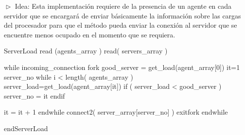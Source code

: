 
$\vartriangleright$ Idea: Esta implementación requiere de la presencia de un agente en cada servidor que se encargará de enviar básicamente
la información sobre las cargas del procesador para que el método pueda enviar la conexión al servidor que se encuentre menos ocupado en el
momento que se requiera.\\

\begin{verbatimtab}[\myTabs]

ServerLoad
	read (agents_array )
	read( servers_array )
	
	while incoming_connection
		fork
			good_server = get_load(agent_array[0])
			it=1
			server_no
			while i < length( agents_array )
				server_load=get_load(agent_array[it])
				if ( server_load < good_server )
					server_no = it
				endif
			
			it = it + 1
			endwhile
			connect2( server_array[server_no] )
		exitfork
	endwhile
	
endServerLoad\\

\end{verbatimtab}\\

